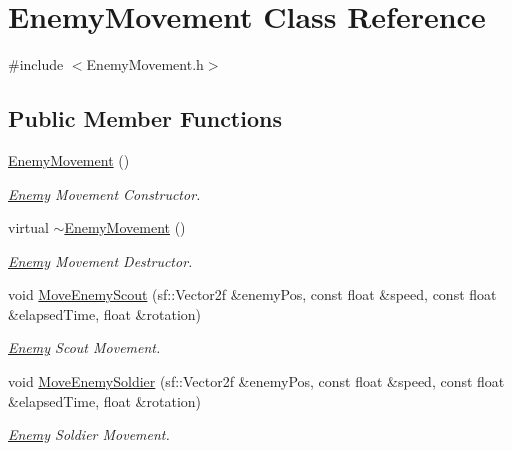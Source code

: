 \hypertarget{class_enemy_movement}{}\section{Enemy\+Movement Class Reference}
\label{class_enemy_movement}


{\ttfamily \#include $<$Enemy\+Movement.\+h$>$}

\subsection*{Public Member Functions}
\begin{DoxyCompactItemize}
\item 
\mbox{\label{class_enemy_movement_ac6f13581112bc274a27105efa6cfc7d7}} 
\hyperlink{class_enemy_movement_ac6f13581112bc274a27105efa6cfc7d7}{Enemy\+Movement} ()
\begin{DoxyCompactList}\small\item\em \hyperlink{class_enemy}{Enemy} Movement Constructor. \end{DoxyCompactList}\item 
\mbox{\label{class_enemy_movement_ae99f4997a60564fcb672030c7b0d3be2}} 
virtual \hyperlink{class_enemy_movement_ae99f4997a60564fcb672030c7b0d3be2}{$\sim$\+Enemy\+Movement} ()
\begin{DoxyCompactList}\small\item\em \hyperlink{class_enemy}{Enemy} Movement Destructor. \end{DoxyCompactList}\item 
void \hyperlink{class_enemy_movement_ac4b06df6242ceae2925ca689cef4cfba}{Move\+Enemy\+Scout} (sf\+::\+Vector2f \&enemy\+Pos, const float \&speed, const float \&elapsed\+Time, float \&rotation)
\begin{DoxyCompactList}\small\item\em \hyperlink{class_enemy}{Enemy} Scout Movement. \end{DoxyCompactList}\item 
void \hyperlink{class_enemy_movement_ae4f8dc0bcd83424c4d6ce76300bdf2c8}{Move\+Enemy\+Soldier} (sf\+::\+Vector2f \&enemy\+Pos, const float \&speed, const float \&elapsed\+Time, float \&rotation)
\begin{DoxyCompactList}\small\item\em \hyperlink{class_enemy}{Enemy} Soldier Movement. \end{DoxyCompactList}\item 

\end{DoxyCompactItemize}
